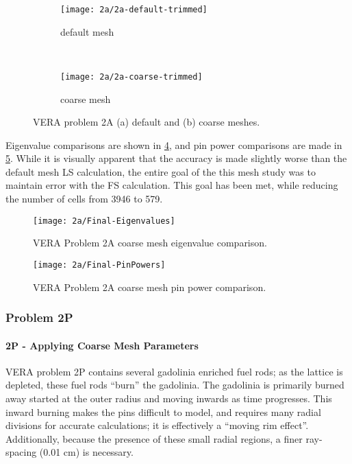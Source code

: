 {{{{{          \begin{figure}[h]
              \centering
              \begin{subfigure}[t]{0.45\textwidth}
                  \centering
                  \texttt{[image: 2a/2a-default-trimmed]}
                  \caption{default mesh\label{fig:LSMOC:2a:Default Mesh}}
              \end{subfigure}%
              ~
              \begin{subfigure}[t]{0.45\textwidth}
                  \centering
                  \texttt{[image: 2a/2a-coarse-trimmed]}
                  \caption{coarse mesh\label{fig:LSMOC:2a:Coarse Mesh}}
              \end{subfigure}
              \caption{VERA problem 2A (a) default and (b) coarse meshes.\label{figs:LSMOC:2a:Meshes}}
          \end{figure}

          Eigenvalue comparisons are shown in \cref{fig:LSMOC:2A:Coarse Mesh:Eigenvalues}, and pin power comparisons are made in \cref{fig:LSMOC:2A:Coarse Mesh:PinPowers}.
          While it is visually apparent that the accuracy is made slightly worse than the default mesh \ac{LS} calculation, the entire goal of the this mesh study was to maintain error with the \ac{FS} calculation.
          This goal has been met, while reducing the number of cells from 3946 to 579.

          \begin{figure}
            \centering
            \texttt{[image: 2a/Final-Eigenvalues]}
            \caption{VERA Problem 2A coarse mesh eigenvalue comparison. \label{fig:LSMOC:2A:Coarse Mesh:Eigenvalues}}
          \end{figure}
          \begin{figure}
            \centering
            \texttt{[image: 2a/Final-PinPowers]}
            \caption{VERA Problem 2A coarse mesh pin power comparison. \label{fig:LSMOC:2A:Coarse Mesh:PinPowers}}
          \end{figure}
        }
      }

      \subsubsection{Problem 2P}{\label{sssec:LSMOC:Problem 2P}
        \paragraph{2P - Applying Coarse Mesh Parameters}{
          \ac{VERA} problem 2P contains several gadolinia enriched fuel rods; as the lattice is depleted, these fuel rods ``burn'' the gadolinia.
          The gadolinia is primarily burned away started at the outer radius and moving inwards as time progresses.
          This inward burning makes the pins difficult to model, and requires many radial divisions for accurate calculations; it is effectively a ``moving rim effect''.
          Additionally, because the presence of these small radial regions, a finer ray-spacing (0.01 cm) is necessary.

}}}}}
